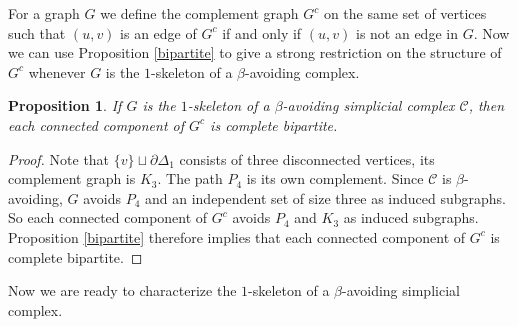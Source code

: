 \documentclass[letterpaper,12pt]{amsart}
\theoremstyle{plain}
\newtheorem{prop}[thm]{Proposition}
\theoremstyle{definition}
\theoremstyle{remark}
\begin{document}
For a graph $G$ we define the complement graph $G^c$ on the same set of vertices
such that $(u,v)$ is an edge of $G^c$ if and only if $(u,v)$ is not an edge in $G$.
Now we can use Proposition \ref{bipartite} to give a strong restriction on the structure of $G^c$ whenever $G$
is the $1$-skeleton of a $\beta$-avoiding complex.

\begin{prop}\label{complement}
	If $G$ is the $1$-skeleton of a $\beta$-avoiding simplicial complex $\mathcal{C}$,
	then each connected component of $G^c$ is complete bipartite.
\end{prop}
\begin{proof}
	Note that $\{v\} \sqcup \partial \Delta_1$ consists of three disconnected vertices, its complement graph is $K_3$.  The path $P_4$ is its own complement.
	Since $\mathcal{C}$ is $\beta$-avoiding,
	$G$ avoids $P_4$ and an independent set of size three as induced subgraphs.
	So each connected component of $G^c$ avoids $P_4$ and $K_3$ as induced subgraphs.
	Proposition \ref{bipartite} therefore implies that each connected component of $G^c$ is complete bipartite.
\end{proof}

Now we are ready to characterize the $1$-skeleton of a $\beta$-avoiding simplicial complex.
\end{document}
